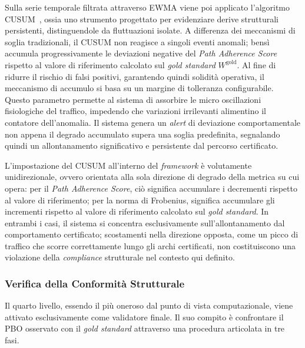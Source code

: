 Sulla serie temporale filtrata attraverso \gls{EWMA} viene poi applicato l'algoritmo
\gls{CUSUM}~\cite{montgomery2009}, ossia uno strumento progettato per evidenziare derive strutturali
persistenti, distinguendole da fluttuazioni isolate. A differenza dei meccanismi di soglia
tradizionali, il \gls{CUSUM} non reagisce a singoli eventi anomali; bensì accumula progressivamente
le deviazioni negative del \textit{Path Adherence Score} rispetto al valore di riferimento
calcolato sul \textit{gold standard} $W^{\text{gold}}$. Al fine di ridurre il rischio di falsi
positivi, garantendo quindi solidità operativa, il meccanismo di accumulo si basa su un margine di
tolleranza configurabile. Questo parametro permette al sistema di assorbire le micro oscillazioni
fisiologiche del traffico, impedendo che variazioni irrilevanti alimentino il contatore
dell'anomalia. Il sistema genera un \textit{alert} di deviazione comportamentale non appena il
degrado accumulato supera una soglia predefinita, segnalando quindi un allontanamento significativo
e persistente dal percorso certificato.

L'impostazione del \gls{CUSUM} all'interno del \textit{framework} è volutamente unidirezionale,
ovvero orientata alla sola direzione di degrado della metrica su cui opera: per il \textit{Path
Adherence Score}, ciò significa accumulare i decrementi rispetto al valore di riferimento; per la
norma di Frobenius, significa accumulare gli incrementi rispetto al valore di riferimento calcolato
sul \textit{gold standard}. In entrambi i casi, il sistema si concentra esclusivamente
sull'allontanamento dal comportamento certificato; scostamenti nella direzione opposta, come un
picco di traffico che scorre correttamente lungo gli archi certificati, non costituiscono una
violazione della \textit{compliance} strutturale nel contesto qui definito.

\subsubsection{Verifica della Conformità Strutturale}
\label{sec:conformita_strutturale}

Il quarto livello, essendo il più oneroso dal punto di vista computazionale, viene attivato
esclusivamente come validatore finale. Il suo compito è confrontare il \gls{PBO} osservato con il
\textit{gold standard} attraverso una procedura articolata in tre fasi.


